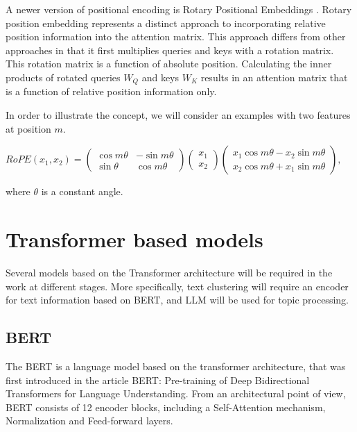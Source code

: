 \documentclass[PMI,VKR]{HSEUniversity}
\begin{document}
A newer version of positional encoding is Rotary Positional Embeddings \cite{rotary:2021}.
Rotary position embedding represents a distinct approach to incorporating relative position information into the attention matrix. 
This approach differs from other approaches in that it first multiplies queries and keys with a rotation matrix. This rotation matrix is a function of absolute position. 
Calculating the inner products of rotated queries $W_Q$ and keys $W_K$ results in an attention matrix that is a function of relative position information only.

In order to illustrate the concept, we will consider an examples with two features at position $m$.
\begin{center}
    $RoPE(x_1, x_2) =   \begin{pmatrix}
                            \cos m\theta & -\sin m\theta\\
                            \sin\theta & \cos m\theta
                        \end{pmatrix} 
                        \begin{pmatrix}
                            x_1 \\
                            x_2
                        \end{pmatrix} 
                        \begin{pmatrix}
                            x_1 \cos m\theta - x_2\sin m\theta\\
                            x_2 \cos m\theta + x_1\sin m\theta
                        \end{pmatrix},
    $
\end{center}
where $\theta$ is a constant angle.


\section{Transformer based models}

Several models based on the Transformer architecture will be required in the work at different stages. 
More specifically, text clustering will require an encoder for text information based on BERT, and LLM will be used for topic processing.

\subsection{BERT}

The BERT is a language model based on the transformer architecture, that was first introduced in the article BERT: Pre-training of Deep Bidirectional Transformers for Language Understanding\cite{bert:2018}.  
From an architectural point of view, BERT consists of 12 encoder blocks, including a Self-Attention mechanism, Normalization and Feed-forward layers.
\end{document}
